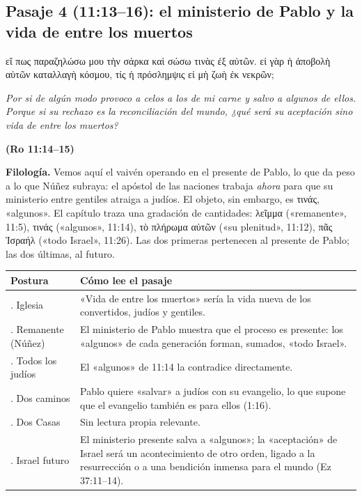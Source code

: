 \documentclass[11pt,letterpaper]{article}
\newcommand{\grc}[1]{\foreignlanguage{ancientgreek}{#1}}
\newcommand{\fuente}[1]{\par\hfill{\upshape\bfseries\small\textcolor{ladrillo}{#1}}}
\begin{document}
\subsection{Pasaje 4 (11:13--16): el ministerio de Pablo y la vida de entre los muertos}

\begin{cita}[fontupper=\upshape]
\grc{εἴ πως παραζηλώσω μου τὴν σάρκα καὶ σώσω τινὰς ἐξ αὐτῶν. εἰ γὰρ ἡ ἀποβολὴ αὐτῶν καταλλαγὴ κόσμου, τίς ἡ πρόσλημψις εἰ μὴ ζωὴ ἐκ νεκρῶν;}\par\smallskip
\itshape Por si de algún modo provoco a celos a los de mi carne y salvo a algunos de ellos. Porque si su rechazo es la reconciliación del mundo, ¿qué será su aceptación sino vida de entre los muertos?\fuente{(Ro 11:14--15)}
\end{cita}

\textbf{Filología.} Vemos aquí el vaivén operando en el presente de Pablo, lo que da peso a lo que Núñez subraya: el apóstol de las naciones trabaja \emph{ahora} para que su ministerio entre gentiles atraiga a judíos. El objeto, sin embargo, es \grc{τινάς}, «algunos». El capítulo traza una gradación de cantidades: \grc{λεῖμμα} («remanente», 11:5), \grc{τινάς} («algunos», 11:14), \grc{τὸ πλήρωμα αὐτῶν} («su plenitud», 11:12), \grc{πᾶς Ἰσραήλ} («todo Israel», 11:26). Las dos primeras pertenecen al presente de Pablo; las dos últimas, al futuro.

\begin{center}\footnotesize
\renewcommand{\arraystretch}{1.25}
\begin{tabular}{>{\RaggedRight\arraybackslash}p{2.9cm}>{\RaggedRight\arraybackslash}p{11.1cm}}
\toprule
\textbf{Postura} & \textbf{Cómo lee el pasaje}\\
\midrule
1. Iglesia & «Vida de entre los muertos» sería la vida nueva de los convertidos, judíos y gentiles.\\
2. Remanente (Núñez) & El ministerio de Pablo muestra que el proceso es presente: los «algunos» de cada generación forman, sumados, «todo Israel».\\
3. Todos los judíos & El «algunos» de 11:14 la contradice directamente.\\
4. Dos caminos & Pablo quiere «salvar» a judíos con su evangelio, lo que supone que el evangelio también es para ellos (1:16).\\
5. Dos Casas & Sin lectura propia relevante.\\
6. Israel futuro & El ministerio presente salva a «algunos»; la «aceptación» de Israel será un acontecimiento de otro orden, ligado a la resurrección o a una bendición inmensa para el mundo (Ez 37:11--14).\\
\bottomrule
\end{tabular}\end{center}
\end{document}
